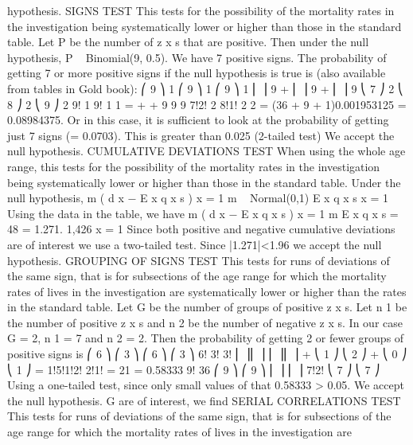 \documentclass[a4paper,12pt]{article}
\begin{document}
hypothesis.
SIGNS TEST
This tests for the possibility of the mortality rates in the investigation being
systematically lower or higher than those in the standard table.
Let P be the number of z x s that are positive.
Then under the null hypothesis, P ~ Binomial(9, 0.5).
We have 7 positive signs. The probability of getting 7 or more positive signs
if the null hypothesis is true is (also available from tables in Gold book):
⎛ 9 ⎞ 1 ⎛ 9 ⎞ 1 ⎛ 9 ⎞ 1
⎜ ⎟ 9 + ⎜ ⎟ 9 + ⎜ ⎟ 9
⎝ 7 ⎠ 2 ⎝ 8 ⎠ 2 ⎝ 9 ⎠ 2
9! 1
9! 1
1
=
+
+ 9
9
9
7!2! 2 8!1! 2
2
= (36 + 9 + 1)0.001953125
= 0.08984375.
Or in this case, it is sufficient to look at the probability of getting just 7 signs
(= 0.0703).
This is greater than 0.025 (2-tailed test)
We accept the null hypothesis.
CUMULATIVE DEVIATIONS TEST
When using the whole age range, this tests for the possibility of the mortality
rates in the investigation being systematically lower or higher than those in the
standard table.
Under the null hypothesis,
m
\sum  ( d x − E x q x s )
x = 1
m
~ Normal(0,1)
\sum  E x q x s
x = 1
Using the data in the table, we have
m
\sum  ( d x − E x q x s )
x = 1
m
\sum  E x q x s
=
48
= 1.271.
1,426
x = 1
Since both positive and negative cumulative deviations are of interest we use a
two-tailed test.
Since |1.271|<1.96 we accept the null hypothesis.
GROUPING OF SIGNS TEST
This tests for runs of deviations of the same sign, that is for subsections of the
age range for which the mortality rates of lives in the investigation are
systematically lower or higher than the rates in the standard table.
Let G be the number of groups of positive z x s.
Let n 1 be the number of positive z x s and n 2 be the number of negative z x s.
In our case G = 2, n 1 = 7 and n 2 = 2.
Then the probability of getting 2 or fewer groups of positive signs is
⎛ 6 ⎞ ⎛ 3 ⎞ ⎛ 6 ⎞ ⎛ 3 ⎞
6! 3!
3!
⎜ ⎟⎜ ⎟ ⎜ ⎟⎜ ⎟
+
⎝ 1 ⎠ ⎝ 2 ⎠ + ⎝ 0 ⎠ ⎝ 1 ⎠ = 1!5!1!2! 2!1! = 21 = 0.58333
9!
36
⎛ 9 ⎞
⎛ 9 ⎞
⎜ ⎟
⎜ ⎟
7!2!
⎝ 7 ⎠
⎝ 7 ⎠
Using a one-tailed test, since only small values of
that 0.58333 > 0.05.
We accept the null hypothesis.
G are of interest, we find%
SERIAL CORRELATIONS TEST
This tests for runs of deviations of the same sign, that is for subsections of the
age range for which the mortality rates of lives in the investigation are
\end{document}
